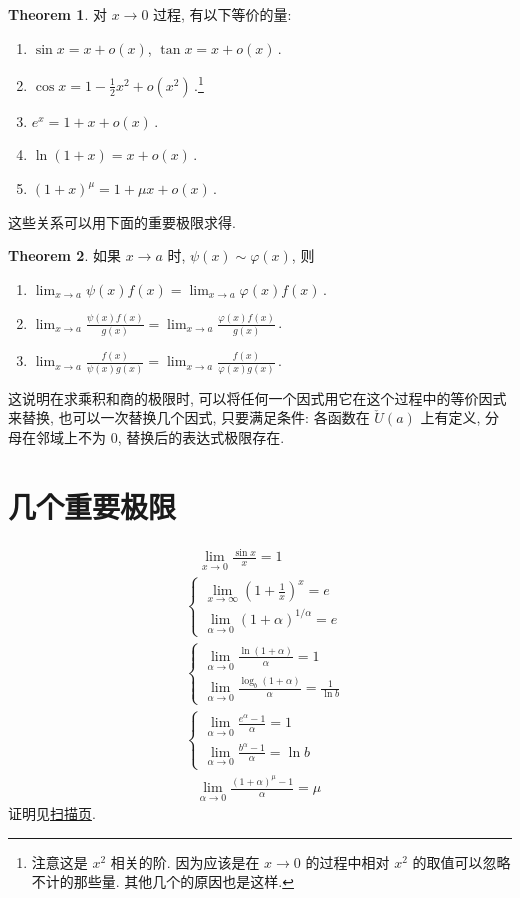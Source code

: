 \documentclass{book}
\newcommand{\e}{e}%
\newcommand{\puncU}[1]{\check{U}\!\left( #1 \right)}
\numberwithin{equation}{section}
\numberwithin{figure}{section}
\theoremstyle{definition}
\newtheorem{theorem}{Theorem}[section]
\begin{document}
\begin{theorem}
  对 $x\to 0$ 过程, 有以下等价的量:
  \begin{enumerate}
    \item $\sin x=x+o(x)$, $\tan x=x+o(x)$\,.
    \item $\cos x=1-\frac{1}{2}x^2+o(x^2)$\,.\footnote{注意这是 $x^2$ 相关的阶. 因为应该是在 $x\to 0$ 的过程中相对 $x^2$ 的取值可以忽略不计的那些量. 其他几个的原因也是这样.}
    \item $\e^x=1+x+o(x)$\,.
    \item $\ln(1+x)=x+o(x)$\,.
    \item $(1+x)^\mu=1+\mu x+o(x)$\,.
  \end{enumerate}
\end{theorem}
这些关系可以用下面的重要极限求得.

\begin{theorem}
  如果 $x\to a$ 时, $\psi(x)\sim\varphi(x)$, 则
  \begin{enumerate}
    \item $\lim_{x\to a}\psi(x)f(x)=\lim_{x\to a}\varphi(x)f(x)$\,.
    \item $\lim_{x\to a}\frac{\psi(x)f(x)}{g(x)}=\lim_{x\to a}\frac{\varphi(x)f(x)}{g(x)}$\,.
    \item $\lim_{x\to a}\frac{f(x)}{\psi(x)g(x)}=\lim_{x\to a}\frac{f(x)}{\varphi(x)g(x)}$\,.
  \end{enumerate}
\end{theorem}
这说明在求乘积和商的极限时, 可以将任何一个因式用它在这个过程中的等价因式来替换, 也可以一次替换几个因式, 只要满足条件: 各函数在 $\puncU{a}$ 上有定义, 分母在邻域上不为 0, 替换后的表达式极限存在.


\section{几个重要极限}
\begin{align}
  &\hspace{11pt}\lim_{x\to 0}\frac{\sin x}{x}=1\\
  &\begin{cases}
    \lim_{x\to \infty}\left( 1+\frac{1}{x} \right)^x=\e\\
    \lim_{\alpha\to 0}(1+\alpha)^{1/\alpha}=\e
  \end{cases}\\
  &\begin{cases}
    \lim_{\alpha\to 0}\frac{\ln(1+\alpha)}{\alpha}=1\\
    \lim_{\alpha\to 0}\frac{\log_b(1+\alpha)}{\alpha}=\frac{1}{\ln b}
  \end{cases}\\
  &\begin{cases}
    \lim_{\alpha\to 0}\frac{\e^\alpha-1}{\alpha}=1\\
    \lim_{\alpha\to 0}\frac{b^\alpha-1}{\alpha}=\ln b
  \end{cases}\\
  &\hspace{9pt}\lim_{\alpha\to 0}\frac{(1+\alpha)^{\mu}-1}{\alpha}=\mu
\end{align}
证明见\hyperlink{scan:ImportantLimit}{扫描页}.
      
\end{document}

